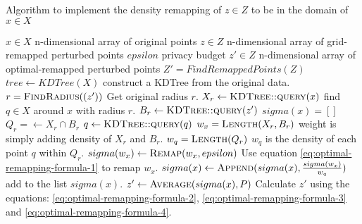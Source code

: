 \begin{algorithm}[H]
  \caption{Algorithm to implement the density remapping of $z \in Z$ to be in the domain of $x \in X$}
  \begin{algorithmic}
    \Require $x \in X$  \Comment n-dimensional array of original points
    \Require $z \in Z$ \Comment n-dimensional array of grid-remapped perturbed points
    \Require $epsilon$ \Comment privacy budget
    \Ensure $z' \in Z$ \Comment n-dimensional array of optimal-remapped perturbed points
    \State $Z' = FindRemappedPoints(Z)$
    \State $tree \gets KDTree(X)$ \Comment construct a KDTree from the original data.
    \State $r = \Call{FindRadius}{(z')}$ \Comment Get original radius $r$.
    \State $X_r \gets \Call{KDTree::query}{x}$ \Comment find $q \in X$ around $x$ with radius $r$.
    \State $B_r \gets \Call{KDTree::query}{z'} $
    \State $sigma(x) = []$
    \State $Q_r = \gets X_r \cap B_r$
    \State $q \gets \Call{KDTree::query}{q}$
    \State $w_x = \Call{Length}{X_r, B_r}$ \Comment weight is simply adding density of $X_r$ and $B_r$.
    \State $w_q = \Call{Length}{Q_r}$ \Comment $w_q$ is the density of each point $q$ within $Q_r$.
    \State $sigma(w_x) \gets \Call{Remap}{w_x, epsilon}$ \Comment Use equation \ref{eq:optimal-remapping-formula-1} to remap $w_x$.
    \State $sigma(x) \gets \Call{Append}{sigma(x), \frac{sigma(w_x)}{w_q}}$ \Comment add to the list $sigma(x)$.
    \EndFor
    \State $z' \gets \Call{Average}{sigma(x), P}$ \Comment Calculate $z'$ using the equations: \ref{eq:optimal-remapping-formula-2}, \ref{eq:optimal-remapping-formula-3} and \ref{eq:optimal-remapping-formula-4}.
    \EndFor
  \end{algorithmic}
  \label{alg:optimal-remapping-laplace}
\end{algorithm}
